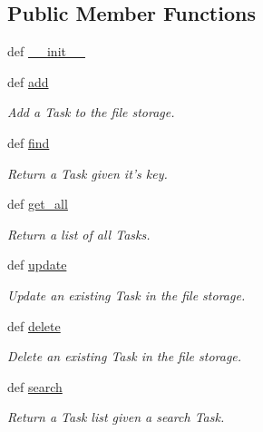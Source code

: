 \subsection*{\-Public \-Member \-Functions}
\begin{DoxyCompactItemize}
\item 
def \hyperlink{classstorage_1_1FileStorage_a43bd213fb32d848345a8cb7fdc34c595}{\-\_\-\-\_\-init\-\_\-\-\_\-}
\item 
def \hyperlink{classstorage_1_1FileStorage_a04e4aa0ef4c652a74825db6ab1c3dd9b}{add}
\begin{DoxyCompactList}\small\item\em \-Add a \-Task to the file storage. \end{DoxyCompactList}\item 
def \hyperlink{classstorage_1_1FileStorage_a4638796fcbe063abc5f1e43230576cae}{find}
\begin{DoxyCompactList}\small\item\em \-Return a \-Task given it's key. \end{DoxyCompactList}\item 
def \hyperlink{classstorage_1_1FileStorage_a8b2e0dbaa297155c82ed56c924674841}{get\-\_\-all}
\begin{DoxyCompactList}\small\item\em \-Return a list of all \-Tasks. \end{DoxyCompactList}\item 
def \hyperlink{classstorage_1_1FileStorage_aa14c1efcc951e67d8cd85c041e32a4bc}{update}
\begin{DoxyCompactList}\small\item\em \-Update an existing \-Task in the file storage. \end{DoxyCompactList}\item 
def \hyperlink{classstorage_1_1FileStorage_aa50ba6664b9e27d2bdcdfb4d8ce135d5}{delete}
\begin{DoxyCompactList}\small\item\em \-Delete an existing \-Task in the file storage. \end{DoxyCompactList}\item 
def \hyperlink{classstorage_1_1FileStorage_a062105b2d65e4fd3608022bb1ad3eb98}{search}
\begin{DoxyCompactList}\small\item\em \-Return a \-Task list given a search \-Task. \end{DoxyCompactList}\end{DoxyCompactItemize}
